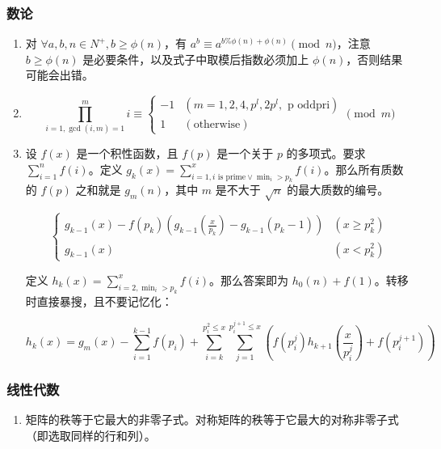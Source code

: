 \subsubsection{数论}

\begin{enumerate}

\item 对 $\forall a, b, n \in N^{+}, b \ge \phi(n)$，有 $a ^ {b} \equiv a ^ {b \% \phi(n) + \phi(n)}\pmod{n}$，注意 $b \ge \phi(n)$ 是必要条件，以及式子中取模后指数必须加上 $\phi(n)$，否则结果可能会出错。

\item

$$
\prod_{i=1,\gcd(i,m)=1}^{m}i\equiv\begin{cases}
-1&(m=1,2,4,p^{l},2p^{l},\text{ p oddpri})\\
1&(\text{otherwise})
\end{cases}\pmod{m}
$$

\item 设 $f(x)$ 是一个积性函数，且 $f(p)$ 是一个关于 $p$ 的多项式。要求 $\sum_{i=1}^{n}f(i)$。定义 $g_{k}(x)=\sum_{i=1,i\text{ is prime}\lor\min_{i}> p_{k}}^{x}f(i)$。那么所有质数的 $f(p)$ 之和就是 $g_{m}(n)$，其中 $m$ 是不大于 $\sqrt{n}$ 的最大质数的编号。

$$
\begin{cases}
g_{k-1}(x)-f(p_{k})(g_{k-1}(\frac{x}{p_{k}})-g_{k-1}(p_{k}-1))&(x\ge p_{k}^{2})\\
g_{k-1}(x)&(x<p_{k}^{2})
\end{cases}
$$

定义 $h_{k}(x)=\sum_{i=2,\min_{i}>p_{k}}^{x}f(i)$。那么答案即为 $h_{0}(n)+f(1)$。转移时直接暴搜，且不要记忆化：

$$
h_{k}(x)=g_{m}(x)-\sum_{i=1}^{k-1}f(p_{i})+\sum_{i=k}^{p_{i}^{2}\le x}\sum_{j=1}^{p_{i}^{j+1}\le x}(f(p_{i}^{j})h_{k+1}(\frac{x}{p_{i}^{j}})+f(p_{i}^{j+1}))
$$

\end{enumerate}

\subsubsection{线性代数}

\begin{enumerate}

\item 矩阵的秩等于它最大的非零子式。对称矩阵的秩等于它最大的对称非零子式（即选取同样的行和列）。

\end{enumerate}

